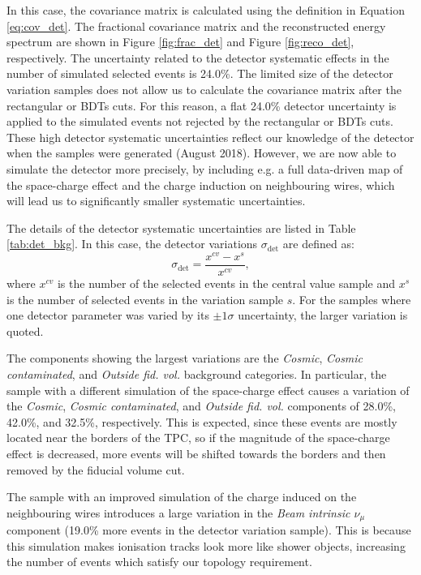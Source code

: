 In this case, the covariance matrix is calculated using the definition in Equation \ref{eq:cov_det}. The fractional covariance matrix and the reconstructed energy spectrum are shown in Figure \ref{fig:frac_det} and Figure \ref{fig:reco_det}, respectively.
The uncertainty related to the detector systematic effects in the number of simulated selected events is 24.0\%. The limited size of the detector variation samples does not allow us to calculate the covariance matrix after the rectangular or BDTs cuts. For this reason, a flat 24.0\% detector uncertainty is applied to the simulated events not rejected by the rectangular or BDTs cuts. These high detector systematic uncertainties reflect our knowledge of the detector when the samples were generated (August 2018). However, we are now able to simulate the detector more precisely, by including e.g. a full data-driven map of the space-charge effect and the charge induction on neighbouring wires, which will lead us to significantly smaller systematic uncertainties. %

The details of the detector systematic uncertainties are listed in Table \ref{tab:det_bkg}. In this case, the detector variations $\sigma_{\mathrm{det}}$ are defined as:
\begin{equation}
    \sigma_{\mathrm{det}} = \frac{x^{cv} - x^s}{x^{cv}},
\end{equation}
where $x^{cv}$ is the number of the selected events in the central value sample and $x^s$ is the number of selected events in the variation sample $s$. For the samples where one detector parameter was varied by its $\pm1\sigma$ uncertainty, the larger variation is quoted.

The components showing the largest variations are the \emph{Cosmic}, \emph{Cosmic contaminated}, and \emph{Outside fid. vol.} background categories. In particular, the sample with a different simulation of the space-charge effect causes a variation of the \emph{Cosmic}, \emph{Cosmic contaminated}, and \emph{Outside fid. vol.} components of 28.0\%, 42.0\%, and 32.5\%, respectively. This is expected, since these events are mostly located near the borders of the TPC, so if the magnitude of the space-charge effect is decreased, more events will be shifted towards the borders and then removed by the fiducial volume cut.

The sample with an improved simulation of the charge induced on the neighbouring wires introduces a large variation in the \emph{Beam intrinsic $\nu_{\mu}$} component (19.0\% more events in the detector variation sample). This is because this simulation makes ionisation tracks look more like shower objects, increasing the number of events which satisfy our topology requirement.

